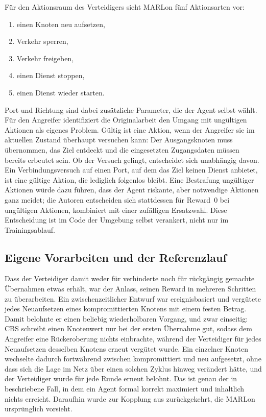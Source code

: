 Für den Aktionsraum des Verteidigers sieht MARLon fünf Aktionsarten vor:
%
\begin{enumerate}
  \item einen Knoten neu aufsetzen,
  \item Verkehr sperren,
  \item Verkehr freigeben,
  \item einen Dienst stoppen,
  \item einen Dienst wieder starten.
\end{enumerate}
%
Port und Richtung sind dabei zusätzliche Parameter, die der Agent selbst
wählt. Für den Angreifer
identifiziert die Originalarbeit den Umgang mit ungültigen Aktionen als eigenes
Problem. Gültig ist eine Aktion, wenn der Angreifer sie im aktuellen Zustand
überhaupt versuchen kann: Der Ausgangsknoten muss übernommen, das Ziel entdeckt
und die eingesetzten Zugangsdaten müssen bereits erbeutet sein. Ob der Versuch
gelingt, entscheidet sich unabhängig davon. Ein Verbindungsversuch auf einen
Port, auf dem das Ziel keinen Dienst anbietet, ist eine gültige Aktion, die
lediglich folgenlos bleibt. Eine Bestrafung ungültiger Aktionen würde dazu
führen, dass der Agent riskante, aber
notwendige Aktionen ganz meidet; die Autoren entscheiden sich stattdessen für
Reward~0 bei ungültigen Aktionen, kombiniert mit einer zufälligen
Ersatzwahl. Diese Entscheidung ist im Code der Umgebung selbst verankert, nicht
nur im Trainingsablauf.

\subsection{Eigene Vorarbeiten und der Referenzlauf}
\label{sec:referenzlauf}

Dass der Verteidiger damit weder für verhinderte noch für rückgängig
gemachte Übernahmen etwas erhält, war der Anlass, seinen Reward in mehreren
Schritten zu überarbeiten. Ein zwischenzeitlicher
Entwurf war ereignisbasiert und vergütete jedes Neuaufsetzen eines
kompromittierten Knotens mit einem festen Betrag. Damit belohnte er einen
beliebig wiederholbaren Vorgang, und
zwar einseitig: \ac{CBS} schreibt einen Knotenwert nur bei der ersten Übernahme
gut, sodass dem Angreifer eine Rückeroberung nichts einbrachte, während der
Verteidiger für jedes Neuaufsetzen desselben Knotens erneut vergütet wurde. Ein
einzelner Knoten wechselte dadurch fortwährend zwischen kompromittiert und neu
aufgesetzt, ohne dass sich die Lage im Netz über einen solchen Zyklus hinweg
verändert hätte, und der Verteidiger wurde für jede Runde erneut belohnt. Das ist genau
der in  beschriebene Fall, in dem ein Agent formal
korrekt maximiert und inhaltlich nichts erreicht. Daraufhin wurde zur Kopplung
aus  zurückgekehrt, die MARLon ursprünglich vorsieht.

